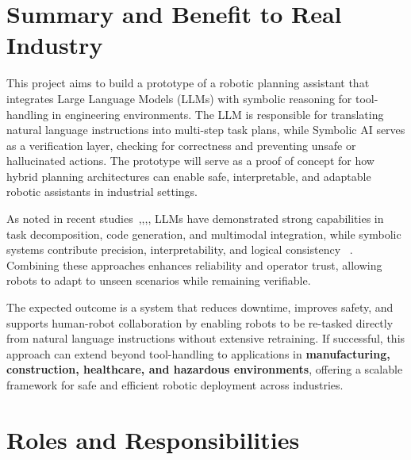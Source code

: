 \documentclass[12pt]{extarticle}
\begin{document}
\section{Summary and Benefit to Real Industry}

This project aims to build a prototype of a robotic planning assistant that integrates Large Language Models (LLMs) with symbolic reasoning for tool-handling in engineering environments. The LLM is responsible for translating natural language instructions into multi-step task plans, while Symbolic AI serves as a verification layer, checking for correctness and preventing unsafe or hallucinated actions. The prototype will serve as a proof of concept for how hybrid planning architectures can enable safe, interpretable, and adaptable robotic assistants in industrial settings.

As noted in recent studies~\cite{enhancing-interpret},\cite{learning-neuro-symbolic},\cite{code-as-symbolic-planner},\cite{code-as-policies}, LLMs have demonstrated strong capabilities in task decomposition, code generation, and multimodal integration, while symbolic systems contribute precision, interpretability, and logical consistency ~\cite{code-as-symbolic-planner}. Combining these approaches enhances reliability and operator trust, allowing robots to adapt to unseen scenarios while remaining verifiable.

The expected outcome is a system that reduces downtime, improves safety, and supports human-robot collaboration by enabling robots to be re-tasked directly from natural language instructions without extensive retraining. If successful, this approach can extend beyond tool-handling to applications in \textbf{manufacturing, construction, healthcare, and hazardous environments}, offering a scalable framework for safe and efficient robotic deployment across industries.

\newpage
\section{Roles and Responsibilities}
\end{document}
